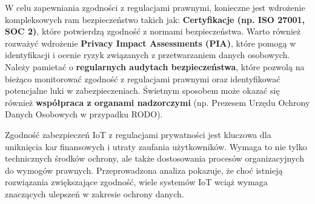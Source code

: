 W celu zapewniania zgodności z regulacjami prawnymi, konieczne jest wdrożenie kompleksowych ram bezpieczeństwo takich jak: \textbf{Certyfikacje (np. ISO 27001, SOC 2)}, które potwierdzą zgodność z normami bezpieczeństwa. Warto również rozważyć wdrożenie \textbf{Privacy Impact Assessments (PIA)}, które pomogą w identyfikacji i ocenie ryzyk związanych z przetwarzaniem danych osobowych. Należy pamietać o \textbf{regularnych audytach bezpieczeństwa}, które pozwolą na bieżąco monitorować zgodność z regulacjami prawnymi oraz identyfikować potencjalne luki w zabezpieczeniach. Świetnym sposobem może okazać się również \textbf{współpraca z organami nadzorczymi} (np. Prezesem Urzędu Ochrony Danych Osobowych w przypadku RODO).

Zgodność zabezpieczeń IoT z regulacjami prywatności jest kluczowa dla uniknięcia kar finansowych i utraty zaufania użytkowników. Wymaga to nie tylko technicznych środków ochrony, ale także dostosowania procesów organizacyjnych do wymogów prawnych. Przeprowadzona analiza pokazuje, że choć istnieją rozwiązania zwiększające zgodność, wiele systemów IoT wciąż wymaga znaczących ulepszeń w zakresie ochrony danych.

